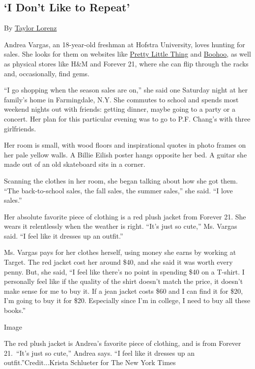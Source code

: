 \hypertarget{i-dont-like-to-repeat}{%
\subsection{`I Don't Like to Repeat'}\label{i-dont-like-to-repeat}}

By \href{https://www.nytimes.com/by/taylor-lorenz}{Taylor Lorenz}

Andrea Vargas, an 18-year-old freshman at Hofstra University, loves
hunting for sales. She looks for them on websites like
\href{https://www.prettylittlething.us/}{Pretty Little Thing} and
\href{https://us.boohoo.com/}{Boohoo}, as well as physical stores like
H\&M and Forever 21, where she can flip through the racks and,
occasionally, find gems.

``I go shopping when the season sales are on,'' she said one Saturday
night at her family's home in Farmingdale, N.Y. She commutes to school
and spends most weekend nights out with friends: getting dinner, maybe
going to a party or a concert. Her plan for this particular evening was
to go to P.F. Chang's with three girlfriends.

Her room is small, with wood floors and inspirational quotes in photo
frames on her pale yellow walls. A Billie Eilish poster hangs opposite
her bed. A guitar she made out of an old skateboard sits in a corner.

Scanning the clothes in her room, she began talking about how she got
them. ``The back-to-school sales, the fall sales, the summer sales,''
she said. ``I love sales.''

Her absolute favorite piece of clothing is a red plush jacket from
Forever 21. She wears it relentlessly when the weather is right. ``It's
just so cute,'' Ms. Vargas said. ``I feel like it dresses up an
outfit.''

Ms. Vargas pays for her clothes herself, using money she earns by
working at Target. The red jacket cost her around \$40, and she said it
was worth every penny. But, she said, ``I feel like there's no point in
spending \$40 on a T-shirt. I personally feel like if the quality of the
shirt doesn't match the price, it doesn't make sense for me to buy it.
If a jean jacket costs \$60 and I can find it for \$20, I'm going to buy
it for \$20. Especially since I'm in college, I need to buy all these
books.''

Image

The red plush jacket is Andrea's favorite piece of clothing, and is from
Forever 21.~``It's just so cute,'' Andrea says. ``I feel like it dresses
up an outfit.''Credit...Krista Schlueter for The New York Times

